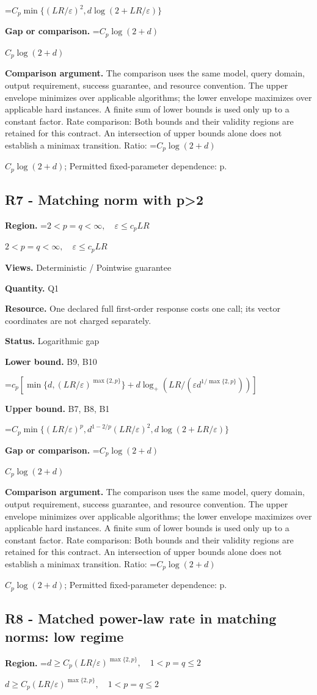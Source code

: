 \documentclass[10pt,a4paper]{article}
\newcommand{\AtlasMath}[1]{\par\begingroup\centering\setbox0=\hbox{$\displaystyle #1$}\ifdim\wd0>1.4\linewidth\typeout{ATLAS WIDE FORMULA: \the\wd0}\fi\ifdim\wd0>\linewidth\resizebox{\linewidth}{!}{\box0}\else\box0\fi\par\endgroup}
\newcommand{\AtlasInlineMath}[1]{\begingroup\setbox0=\hbox{$#1$}\ifdim\wd0>.4\linewidth\endgroup\AtlasMath{#1}\else\endgroup$#1$\fi}
\begin{document}
\AtlasMath{C_p\min\{(LR/\varepsilon)^2,d\log(2+LR/\varepsilon)\}}
\textbf{Gap or comparison.} \AtlasInlineMath{C_p\log(2+d)}

\textbf{Comparison argument.} The comparison uses the same model, query domain, output requirement, success guarantee, and resource convention. The upper envelope minimizes over applicable algorithms; the lower envelope maximizes over applicable hard instances. A finite sum of lower bounds is used only up to a constant factor. Rate comparison: Both bounds and their validity regions are retained for this contract. An intersection of upper bounds alone does not establish a minimax transition. Ratio: \AtlasInlineMath{C_p\log(2+d)}; Permitted fixed-parameter dependence: p.

\subsection{R7 - Matching norm with p>2}
\textbf{Region.} \AtlasInlineMath{2<p=q<\infty,\quad\varepsilon\le c_pLR}

\textbf{Views.} Deterministic / Pointwise guarantee

\textbf{Quantity.} Q1

\textbf{Resource.} One declared full first-order response costs one call; its vector coordinates are not charged separately.

\textbf{Status.} Logarithmic gap

\textbf{Lower bound.} B9, B10

\AtlasMath{c_p[\min\{d,(LR/\varepsilon)^{\max\{2,p\}}\}+d\log_+(LR/(\varepsilon d^{1/\max\{2,p\}}))]}
\textbf{Upper bound.} B7, B8, B1

\AtlasMath{C_p\min\{(LR/\varepsilon)^p,d^{1-2/p}(LR/\varepsilon)^2,d\log(2+LR/\varepsilon)\}}
\textbf{Gap or comparison.} \AtlasInlineMath{C_p\log(2+d)}

\textbf{Comparison argument.} The comparison uses the same model, query domain, output requirement, success guarantee, and resource convention. The upper envelope minimizes over applicable algorithms; the lower envelope maximizes over applicable hard instances. A finite sum of lower bounds is used only up to a constant factor. Rate comparison: Both bounds and their validity regions are retained for this contract. An intersection of upper bounds alone does not establish a minimax transition. Ratio: \AtlasInlineMath{C_p\log(2+d)}; Permitted fixed-parameter dependence: p.

\subsection{R8 - Matched power-law rate in matching norms: low regime}
\textbf{Region.} \AtlasInlineMath{d\ge C_p(LR/\varepsilon)^{\max\{2,p\}},\quad1<p=q\le2}
\end{document}
